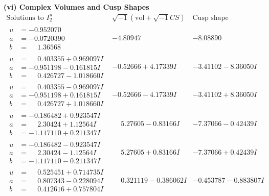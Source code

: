 \documentclass[1p]{elsarticle_modified}
\theoremstyle{definition}
\newcommand{\I}{\sqrt{-1}}
\begin{document}
\newpage\flushleft \textbf{(vi) Complex Volumes and Cusp Shapes}
$$\begin{array}{c|c|c}  
\text{Solutions to }I^u_{2}& \I (\text{vol} + \sqrt{-1}CS) & \text{Cusp shape}\\
 \hline 
\begin{aligned}
u &= -0.952070\phantom{ +0.000000I} \\
a &= -0.0720390\phantom{ +0.000000I} \\
b &= \phantom{-}1.36568\phantom{ +0.000000I}\end{aligned}
 & -4.80947\phantom{ +0.000000I} & -8.08890\phantom{ +0.000000I} \\ \hline\begin{aligned}
u &= \phantom{-}0.403355 + 0.969097 I \\
a &= -0.951198 - 0.161815 I \\
b &= \phantom{-}0.426727 - 1.018660 I\end{aligned}
 & -0.52666 + 4.17339 I & -3.41102 - 8.36050 I \\ \hline\begin{aligned}
u &= \phantom{-}0.403355 - 0.969097 I \\
a &= -0.951198 + 0.161815 I \\
b &= \phantom{-}0.426727 + 1.018660 I\end{aligned}
 & -0.52666 - 4.17339 I & -3.41102 + 8.36050 I \\ \hline\begin{aligned}
u &= -0.186482 + 0.923547 I \\
a &= \phantom{-}2.30424 + 1.12564 I \\
b &= -1.117110 + 0.211347 I\end{aligned}
 & \phantom{-}5.27605 - 0.83166 I & -7.37066 - 0.42439 I \\ \hline\begin{aligned}
u &= -0.186482 - 0.923547 I \\
a &= \phantom{-}2.30424 - 1.12564 I \\
b &= -1.117110 - 0.211347 I\end{aligned}
 & \phantom{-}5.27605 + 0.83166 I & -7.37066 + 0.42439 I \\ \hline\begin{aligned}
u &= \phantom{-}0.525451 + 0.714735 I \\
a &= \phantom{-}0.807343 - 0.228094 I \\
b &= \phantom{-}0.412616 + 0.757804 I\end{aligned}
 & \phantom{-}0.321119 - 0.386062 I & -0.453787 - 0.883807 I \\ \hline\begin{aligned}

\end{aligned}
\end{array}$$
\end{document}
